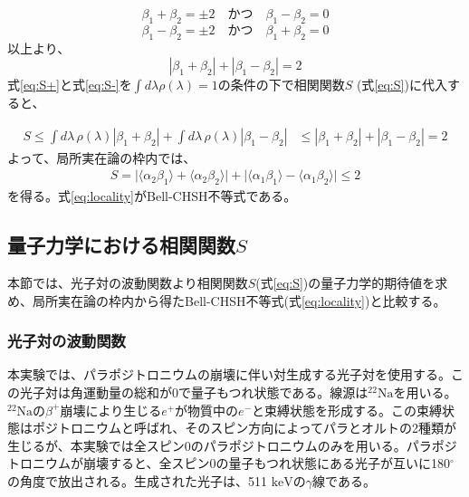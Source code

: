 \documentclass[../../main.tex]{subfiles}
\numberwithin{equation}{section}
\numberwithin{table}{section}
\numberwithin{figure}{section}
\begin{document}
\begin{equation}
	\beta_1+\beta_2=\pm2 \quad \text{かつ} \quad \beta_1-\beta_2=0
\end{equation}
\begin{equation}
	\beta_1-\beta_2=\pm2 \quad \text{かつ} \quad \beta_1+\beta_2=0
\end{equation}
以上より、
\begin{equation}
	\left\lvert \beta_1+\beta_2 \right\rvert+\left\lvert \beta_1-\beta_2 \right\rvert=2 \label{eq:abs}
\end{equation}
式\eqref{eq:S+}と式\eqref{eq:S-}を$\int d\lambda \rho(\lambda) =1 $の条件の下で相関関数$S$ (式\ref{eq:S})に代入すると、

\begin{align}
	S \leq  \int d\lambda \, \rho(\lambda)  \left\lvert \beta_1+\beta_2 \right\rvert + \int d\lambda \, \rho(\lambda)  \left\lvert \beta_1-\beta_2 \right\rvert
  & \leq \left\lvert \beta_1+\beta_2 \right\rvert+\left\lvert \beta_1-\beta_2 \right\rvert=2
\end{align}
よって、局所実在論の枠内では、
\begin{align}
	S = \lvert \langle \alpha_2\beta_1 \rangle + \langle \alpha_2\beta_2 \rangle	\rvert+
	\lvert \langle \alpha_1\beta_1 \rangle - \langle \alpha_1\beta_2 \rangle	\rvert \leq 2\label{eq:locality}
\end{align}
を得る。式\eqref{eq:locality}がBell-CHSH不等式である。
\newpage
\subsection{量子力学における相関関数$S$}
本節では、光子対の波動関数より相関関数$S$(式\eqref{eq:S})の量子力学的期待値を求め、局所実在論の枠内から得たBell-CHSH不等式(式\eqref{eq:locality})と比較する。

\subsubsection{光子対の波動関数}
本実験では、パラポジトロニウムの崩壊に伴い対生成する光子対を使用する。この光子対は角運動量の総和が$0$で量子もつれ状態である。線源は$^{22}\text{Na}$を用いる。$^{22}\text{Na}$の$\beta^+$崩壊により生じる$e^+$が物質中の$e^-$と束縛状態を形成する。この束縛状態はポジトロニウムと呼ばれ、そのスピン方向によってパラとオルトの2種類が生じるが、本実験では全スピン$0$のパラポジトロニウムのみを用いる。パラポジトロニウムが崩壊すると、全スピン$0$の量子もつれ状態にある光子が互いに180$^\circ$の角度で放出される。生成された光子は、511 $\si{\kilo\electronvolt}$の$\gamma$線である。
\end{document}
